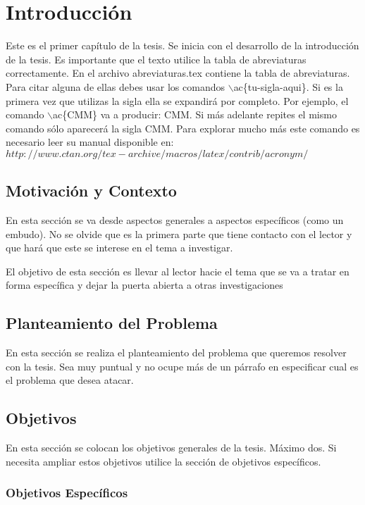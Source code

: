 \chapter{Introducción}

Este es el primer capítulo de la tesis. Se inicia con el desarrollo de la introducción de la tesis. Es importante que el texto utilice la tabla de abreviaturas correctamente. En el archivo abreviaturas.tex contiene la tabla de abreviaturas. Para citar alguna de ellas debes usar los comandos $\backslash$ac\{tu-sigla-aqui\}. Si es la primera vez que utilizas la sigla ella se expandirá por completo. Por ejemplo, el comando $\backslash$ac\{CMM\} va a producir: \ac{CMM}. Si más adelante repites el mismo comando sólo aparecerá la sigla \ac{CMM}. Para explorar mucho más este comando es necesario leer su manual disponible en: $http://www.ctan.org/tex-archive/macros/latex/contrib/acronym/$


\section{Motivación y Contexto}

En esta sección se va desde aspectos generales a  aspectos específicos (como un embudo). No se olvide que es la primera parte que tiene contacto con el lector y que hará que este se interese en el tema a investigar.

El objetivo de esta sección es llevar al lector hacie el tema que se va a tratar en forma específica y dejar la puerta abierta a otras investigaciones

\section{Planteamiento del Problema}

En esta sección se realiza el planteamiento del problema que queremos resolver con la tesis. Sea muy puntual y no ocupe más de un párrafo en especificar cual es el problema que desea atacar.

\section{Objetivos}

En esta sección se colocan los objetivos generales de la tesis. Máximo dos. Si necesita ampliar estos objetivos utilice la sección de objetivos específicos.

\subsection{Objetivos Específicos}


